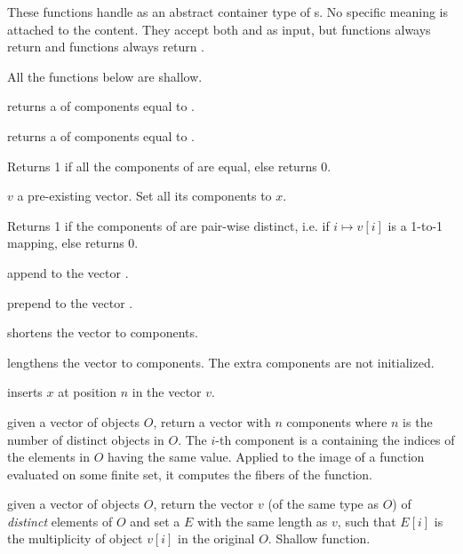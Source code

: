 
These functions handle  as an abstract container type of
s. No specific meaning is attached to the content. They accept both
 and  as input, but  functions always return
 and  functions always return .

 All the functions below are shallow.

 returns a  of  components
equal to .

 returns a  of  components
equal to .

 Returns 1 if all the components of  are
equal, else returns 0.

 $v$ a pre-existing vector. Set all its
components to $x$.

  Returns 1 if the components of  are
pair-wise distinct, i.e. if $i\mapsto v[i]$ is a 1-to-1 mapping, else returns
0.

 append  to the vector .

 prepend  to the vector .

 shortens the vector  to 
components.

 lengthens the vector 
to  components. The extra components are not initialized.

 inserts $x$ at position $n$ in the vector
$v$.

 given a vector of objects $O$, return a vector
with $n$ components where $n$ is the number of distinct objects in $O$. The
$i$-th component is a  containing the indices of the elements
in $O$ having the same value. Applied to the image of a function evaluated on
some finite set, it computes the fibers of the function.

 given a vector of objects $O$,
return the vector $v$ (of the same type as $O$) of \emph{distinct} elements
of $O$ and set a  $E$ with the same length as $v$, such
that $E[i]$ is the multiplicity of object $v[i]$ in the original $O$.
Shallow function.

